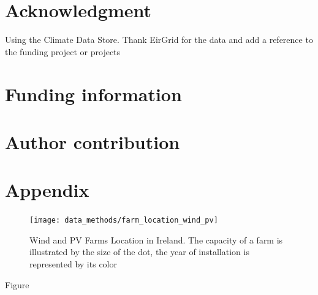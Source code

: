 \documentclass[a4paper, 11pt]{article}
\begin{document}

\newpage
\section{Acknowledgment}
Using the Climate Data Store. Thank EirGrid for the data and add a reference to the funding project or projects

\section{Funding information}

\section{Author contribution}



\newpage
\section*{Appendix}

\begin{figure}[!ht]
	\centering
	\texttt{[image: data\_methods/farm\_location\_wind\_pv]}
	\caption{Wind and PV Farms Location in Ireland. The capacity of a farm is illustrated by the size of the dot, the year of installation is represented by its color}	
	\label{fig:farm_location_wind_pv}
\end{figure}

Figure  
\end{document}
